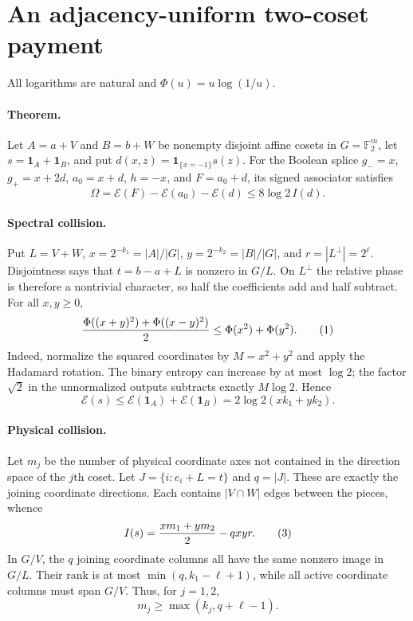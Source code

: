 \section*{An adjacency-uniform two-coset payment}
All logarithms are natural and $\Phi(u)=u\log(1/u)$.

\paragraph{Theorem.}
Let $A=a+V$ and $B=b+W$ be nonempty disjoint affine cosets in
$G=\mathbb F_2^m$, let $s=\mathbf1_A+\mathbf1_B$, and put
$d(x,z)=\mathbf1_{\{x=-1\}}s(z)$.  For the Boolean splice
$g_-=x$, $g_+=x+2d$, $a_0=x+d$, $h=-x$, and $F=a_0+d$, its signed
associator satisfies
\[
 \Omega=\mathcal E(F)-\mathcal E(a_0)-\mathcal E(d)
 \le 8\log2\,I(d).
\]

\paragraph{Spectral collision.}
Put $L=V+W$, $x=2^{-k_1}=|A|/|G|$, $y=2^{-k_2}=|B|/|G|$, and
$r=|L^\perp|=2^\ell$.  Disjointness says that
$t=b-a+L$ is nonzero in $G/L$.  On $L^\perp$ the relative phase is
therefore a nontrivial character, so half the coefficients add and half
subtract.  For all $x,y\ge0$,
\[
 {\Phi((x+y)^2)+\Phi((x-y)^2)\over2}\le\Phi(x^2)+\Phi(y^2). \tag{1}
\]
Indeed, normalize the squared coordinates by $M=x^2+y^2$ and apply the
Hadamard rotation.  The binary entropy can increase by at most $\log2$;
the factor $\sqrt2$ in the unnormalized outputs subtracts exactly
$M\log2$.  Hence
\[
 \mathcal E(s)\le\mathcal E(\mathbf1_A)+\mathcal E(\mathbf1_B)
 =2\log2(xk_1+yk_2).                                      \tag{2}
\]

\paragraph{Physical collision.}
Let $m_j$ be the number of physical coordinate axes not contained in the
direction space of the $j$th coset.  Let
$J=\{i:e_i+L=t\}$ and $q=|J|$.  These are exactly the joining coordinate
directions.  Each contains $|V\cap W|$ edges between the pieces, whence
\[
 I(s)={xm_1+ym_2\over2}-qxyr.                              \tag{3}
\]
In $G/V$, the $q$ joining coordinate columns all have the same nonzero
image in $G/L$.  Their rank is at most
$\min(q,k_1-\ell+1)$, while all active coordinate columns must span
$G/V$.  Thus, for $j=1,2$,
\[
 m_j\ge\max(k_j,q+\ell-1).                                \tag{4}
\]

